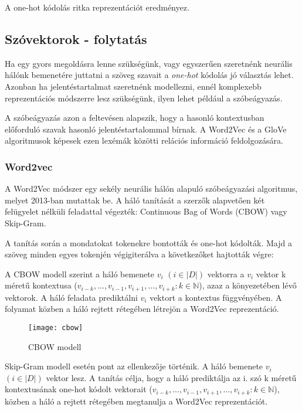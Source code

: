 \begin{note}
	A one-hot kódolás ritka reprezentációt eredményez.
\end{note}

\subsection*{Szóvektorok - folytatás}
Ha egy gyors megoldásra lenne szükségünk, vagy egyszerűen szeretnénk neurális hálónk bemenetére juttatni a szöveg szavait a \textit{one-hot} kódolás jó választás lehet. Azonban ha jelentéstartalmat szeretnénk modellezni, ennél komplexebb reprezentációs módszerre lesz szükségünk, ilyen lehet például a szóbeágyazás.

A szóbeágyazás azon a feltevésen alapszik, hogy a hasonló kontextusban előforduló szavak hasonló jelentéstartalommal bírnak. A Word2Vec és a GloVe algoritmusok képesek ezen lexémák közötti relációs információ feldolgozására.

\subsubsection{Word2vec}
A Word2Vec \cite{mikolov2013efficient} módszer egy sekély neurális hálón alapuló szóbeágyazási algoritmus, melyet 2013-ban mutattak be. A háló tanítását a szerzők alapvetően két felügyelet nélküli feladattal végezték: Continuous Bag of Words (CBOW) vagy Skip-Gram.

A tanítás során a mondatokat tokenekre bontották és one-hot kódolták. Majd a szöveg minden egyes tokenjén végigiterálva a következőket hajtották végre:

A CBOW modell szerint a háló bemenete $v_i$
$\left( i \in \left|D\right| \right)$ vektorra a $v_i$ vektor k méretű kontextusa ($v_{i-k},...,v_{i-1}, v_{i+1},..., v_{i+k} : k \in \mathbb{N}$), azaz a könyezetében lévő vektorok. A háló feladata prediktálni $v_i$ vektort a kontextus függvényében. A folyamat közben a háló rejtett rétegében létrejön a Word2Vec reprezentáció.

\begin{figure}[H]
	\centering
	\texttt{[image: cbow]}
	\caption{CBOW modell}
\end{figure}

Skip-Gram modell esetén pont az ellenkezője történik. A háló bemenete $v_i$
$\left( i \in \left|D\right| \right)$ vektor lesz. A tanítás célja, hogy a háló prediktálja az i. szó k méretű kontextusának one-hot kódolt vektorait ($v_{i-k},...,v_{i-1}, v_{i+1},..., v_{i+k} : k \in \mathbb{N}$), közben a háló a rejtett rétegében megtanulja a Word2Vec reprezentációt.

